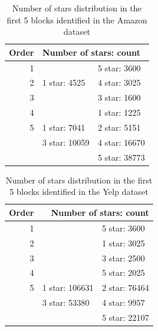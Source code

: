 \begin{table}[htbp]
\centering
\caption{Number of stars distribution in the first 5 blocks identified in the Amazon dataset}
\label{tab: amazon}
\begin{tabular}{r|ll}
\hline
\multicolumn{1}{l|}{Order} & \multicolumn{2}{l}{Number of stars: count} \\ \hline
1                          &                      & 5 star: 3600         \\
2                          & 1 star: 4525         & 4 star: 3025         \\
3                          &                      & 3 star: 1600         \\
4                          &                      & 1 star: 1225         \\
5                          & 1 star: 7041         & 2 star: 5151         \\
\multicolumn{1}{l|}{}      & 3 star: 10059        & 4 star: 16670        \\
\multicolumn{1}{l|}{}      &                      & 5 star: 38773        \\ \hline
\end{tabular}
\end{table}

\begin{table}[htbp]
\centering
\caption{Number of stars distribution in the first 5 blocks identified in the Yelp dataset}
\label{tab: yelp}
\begin{tabular}{r|ll}
\hline
\multicolumn{1}{l|}{Order} & \multicolumn{2}{r}{Number of stars: count} \\ \hline
1                          &                       & 5 star: 3600        \\
2                          &                       & 1 star: 3025        \\
3                          &                       & 3 star: 2500        \\
4                          &                       & 5 star: 2025        \\
5                          & 1 star: 106631        & 2 star: 76464       \\
\multicolumn{1}{l|}{}      & 3 star: 53380         & 4 star: 9957        \\
\multicolumn{1}{l|}{}      &                       & 5 star: 22107       \\ \hline
\end{tabular}
\end{table}